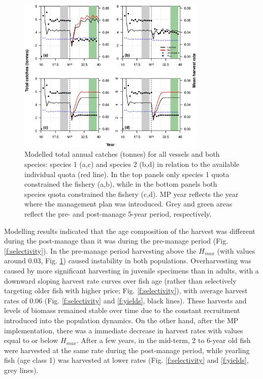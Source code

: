 \documentclass[12pt,oneline,a4paper,numbib]{ouparticle}
\numberwithin{equation}{subsection} %
\begin{document}
\begin{figure}[!ht]
\centering
\includegraphics[width=0.8\textwidth]{Figures/Catches.eps} 
\caption{Modelled total annual catches (tonnes) for all vessels and both species: species 1 (a,c) and species 2 (b,d) in relation to the available individual quota (red line). In the top panels only species 1 quota constrained the fishery (a,b), while in the bottom panels both species quota constrained the fishery (c,d). MP year reflects the year where the management plan was introduced. Grey and green areas reflect the pre- and post-manage 5-year period, respectively.}
\label{f:catches}
\end{figure}

Modelling results indicated that the age composition of the harvest was different during the post-manage than it was during the pre-manage period (Fig. \ref{f:selectivity}). In the pre-manage period harvesting above the $H_{max}$ (with values around 0.03, Fig. \ref{f:catches}) caused instability in both populations. Overharvesting was caused by more significant harvesting in juvenile specimens than in adults, with a downward sloping harvest rate curves over fish age (rather than selectively targeting older fish with higher price; Fig. \ref{f:selectivity}), with average harvest rates of 0.06 (Fig. \ref{f:selectivity} and \ref{f:yields}, black lines). These harvests and levels of biomass remained stable over time due to the constant recruitment introduced into the population dynamics. On the other hand, after the MP implementation, there was a immediate decrease in harvest rates with values equal to or below $H_{max}$. After a few years, in the mid-term, 2 to 6-year old fish were harvested at the same rate during the post-manage period, while yearling fish (age class 1) was harvested at lower rates (Fig. \ref{f:selectivity} and \ref{f:yields}, grey lines).
\end{document}
